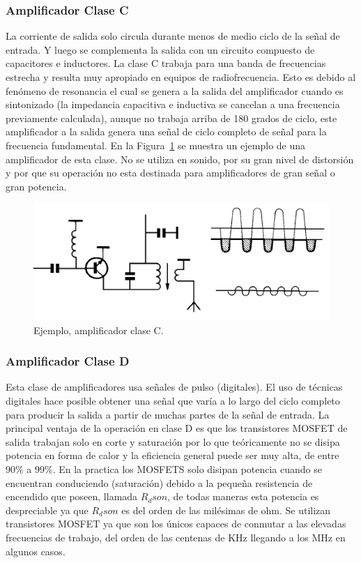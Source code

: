\medskip 
\subsubsection*{Amplificador Clase C}


La corriente de salida solo circula durante menos de medio ciclo de la señal de entrada. Y luego se complementa la salida con un circuito compuesto de capacitores e inductores.
La clase C trabaja para una banda de frecuencias estrecha y resulta muy apropiado en equipos de radiofrecuencia. Esto es debido al fenómeno de resonancia el cual se genera a la salida del amplificador cuando es sintonizado (la impedancia capacitiva e inductiva se cancelan a una frecuencia previamente calculada), aunque no trabaja arriba de 180 grados de ciclo, este amplificador a la salida genera una señal de ciclo completo de señal para la frecuencia fundamental. En la Figura~\ref{ampliC} se muestra un ejemplo de una amplificador de esta clase.
No se utiliza en sonido, por su gran nivel de distorsión y por que su operación no esta destinada para amplificadores de gran señal o gran potencia.

\begin{figure}[H]
\centering
\includegraphics[scale=0.35]{img/ampliC.png}
\caption{Ejemplo, amplificador clase C.}
\label{ampliC} 
\end{figure}

\medskip 
\subsubsection*{Amplificador Clase D}

Esta clase de amplificadores usa señales de pulso (digitales). El uso de técnicas digitales hace posible obtener una señal que varía a lo largo del ciclo completo para producir la salida a partir de muchas partes de la señal de entrada. La principal ventaja de la operación en clase D es que los transistores MOSFET de salida trabajan solo en corte y saturación por lo que teóricamente no se disipa potencia en forma de calor y la eficiencia general puede ser muy alta, de entre 90\% a 99\%. En la practica los MOSFETS solo disipan potencia cuando se encuentran conduciendo (saturación) debido a la pequeña resistencia de encendido que poseen, llamada $R_dson$, de todas maneras esta potencia es despreciable ya que $R_dson$ es del orden de las milésimas de ohm. Se utilizan transistores MOSFET ya que son los únicos capaces de conmutar a las elevadas frecuencias de trabajo, del orden de las centenas de KHz llegando a los MHz en algunos casos.


